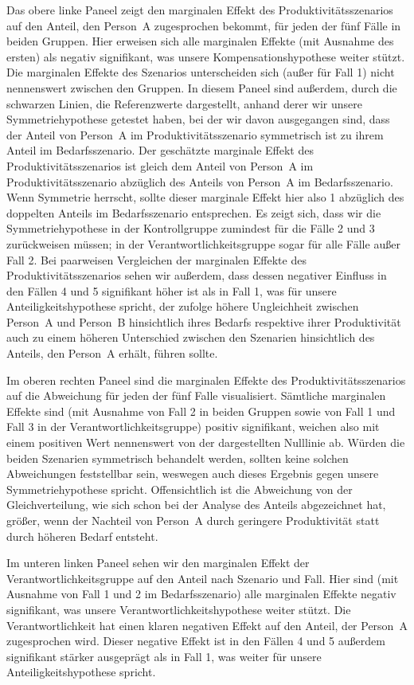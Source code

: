 \documentclass[justified,nobib,symmetric,twoside]{tufte-handout}
\begin{document}
Das obere linke Paneel zeigt den marginalen Effekt des Produktivitätsszenarios auf den Anteil, den Person~A zugesprochen bekommt, für jeden der fünf Fälle in beiden Gruppen.
Hier erweisen sich alle marginalen Effekte (mit Ausnahme des ersten) als negativ signifikant, was unsere Kompensationshypothese weiter stützt.
Die marginalen Effekte des Szenarios unterscheiden sich (außer für Fall 1) nicht nennenswert zwischen den Gruppen.
In diesem Paneel sind außerdem, durch die schwarzen Linien, die Referenzwerte dargestellt, anhand derer wir unsere Symmetriehypothese getestet haben, bei der wir davon ausgegangen sind, dass der Anteil von Person~A im Produktivitätsszenario symmetrisch ist zu ihrem Anteil im Bedarfs\-szenario.
Der geschätzte marginale Effekt des Produktivitätsszenarios ist gleich dem Anteil von Person~A im Produktivitätsszenario abzüglich des Anteils von Person~A im Bedarfs\-szenario.
Wenn Symmetrie herrscht, sollte dieser marginale Effekt hier also 1 abzüglich des doppelten Anteils im Bedarfsszenario entsprechen.
Es zeigt sich, dass wir die Symmetriehypothese in der Kontrollgruppe zumindest für die Fälle 2 und 3 zurückweisen müssen; in der Verantwortlichkeitsgruppe sogar für alle Fälle außer Fall 2.
Bei paarweisen Vergleichen der marginalen Effekte des Produktivitätsszenarios sehen wir außerdem, dass dessen negativer Einfluss in den Fällen 4 und 5 signifikant höher ist als in Fall 1, was für unsere Anteiligkeitshypothese spricht, der zufolge höhere Ungleichheit zwischen Person~A und Person~B hinsichtlich ihres Bedarfs respektive ihrer Produktivität auch zu einem höheren Unterschied zwischen den Szenarien hinsichtlich des Anteils, den Person~A erhält, führen sollte.

Im oberen rechten Paneel sind die marginalen Effekte des Produktivitätsszenarios auf die Abweichung für jeden der fünf Falle visualisiert.
Sämtliche marginalen Effekte sind (mit Ausnahme von Fall 2 in beiden Gruppen sowie von Fall 1 und Fall 3 in der Verantwortlichkeitsgruppe) positiv signifikant, weichen also mit einem positiven Wert nennenswert von der dargestellten Nulllinie ab.
Würden die beiden Szenarien symmetrisch behandelt werden, sollten keine solchen Abweichungen feststellbar sein, weswegen auch dieses Ergebnis gegen unsere Symmetriehypothese spricht.
Offensichtlich ist die Abweichung von der Gleichverteilung, wie sich schon bei der Analyse des Anteils abgezeichnet hat, größer, wenn der Nachteil von Person~A durch geringere Produktivität statt durch höheren Bedarf entsteht.

Im unteren linken Paneel sehen wir den marginalen Effekt der Verantwortlichkeitsgruppe auf den Anteil nach Szenario und Fall.
Hier sind (mit Ausnahme von Fall 1 und 2 im Bedarfsszenario) alle marginalen Effekte negativ signifikant, was unsere Verantwortlichkeitshypothese weiter stützt.
Die Verantwortlichkeit hat einen klaren negativen Effekt auf den Anteil, der Person~A zugesprochen wird.
Dieser negative Effekt ist in den Fällen 4 und 5 außerdem signifikant stärker ausgeprägt als in Fall 1, was weiter für unsere Anteiligkeitshypothese spricht.
\end{document}
